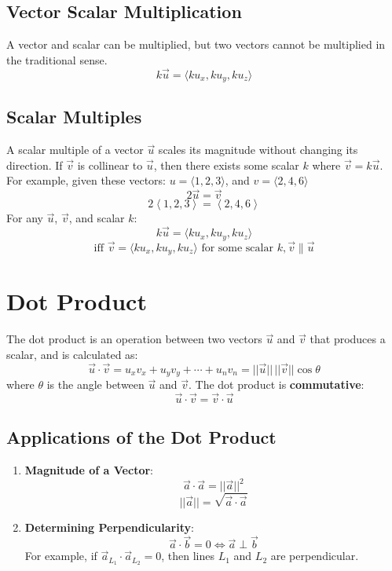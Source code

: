 \documentclass[a4paper,12pt,openany]{book}
\newcommand{\vcomponents}[4]{
    #1 = \langle #2, #3, #4 \rangle
}
\begin{document}
\subsection{Vector Scalar Multiplication}
A vector and scalar can be multiplied, but two vectors cannot be multiplied in the traditional sense.
\[
    k\vec{u} = \langle ku_x, ku_y, ku_z \rangle
\]


\subsection{Scalar Multiples}
A scalar multiple of a vector \(\vec{u}\) scales its magnitude without changing its direction. If \(\vec{v}\) is collinear to \(\vec{u}\), then there exists some scalar $k$ where \(\vec{v} = k\vec{u}\).
For example, given these vectors: $\vcomponents{u}{1}{2}{3}$, and $\vcomponents{v}{2}{4}{6}$
\[
2\vec{u} = \vec{v}
\]
\[
2\left\langle 1, 2, 3\right\rangle = 
\left\langle 2, 4, 6\right\rangle
\]
For any \(\vec{u}\), \(\vec{v}\), and scalar \(k\):
\[
k\vec{u} = \langle ku_x, ku_y, ku_z \rangle
\]
\[
    \text{iff } \vec{v} = \langle ku_x, ku_y, ku_z \rangle \text{ for some scalar } k, \vec{v} \parallel \vec{u}
\]


\section{Dot Product}
The dot product is an operation between two vectors \(\vec{u}\) and \(\vec{v}\) that produces a scalar, and is calculated as:
\[
    \vec{u} \cdot \vec{v} = u_x v_x + u_y v_y + \cdots + u_n v_n = ||\vec{u}|| \, ||\vec{v}|| \cos{\theta}
\]
where \(\theta\) is the angle between \(\vec{u}\) and \(\vec{v}\). The dot product is \textbf{commutative}:
\[
    \vec{u} \cdot \vec{v} = \vec{v} \cdot \vec{u}
\] 

\subsection{Applications of the Dot Product}
\begin{enumerate}
    \item \textbf{Magnitude of a Vector}:
    \[
        \vec{a} \cdot \vec{a} = ||\vec{a}||^2
    \]
    \[
        ||\vec{a}|| = \sqrt{\vec{a} \cdot \vec{a}}
    \]

    \item \textbf{Determining Perpendicularity}:
    \[
        \vec{a} \cdot \vec{b} = 0 \iff \vec{a} \perp \vec{b}
    \]
    For example, if \(\vec{a}_{L_1} \cdot \vec{a}_{L_2} = 0\), then lines \(L_1\) and \(L_2\) are perpendicular.
\end{enumerate}
\end{document}
